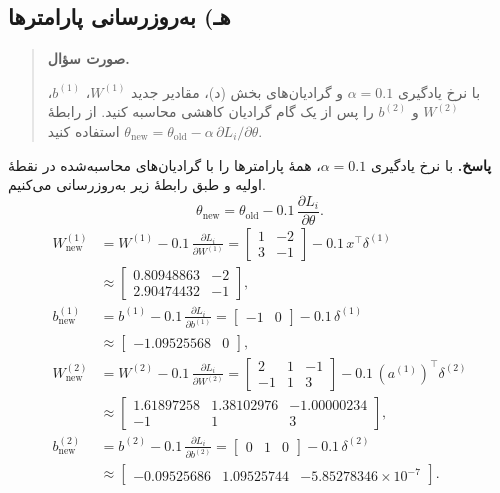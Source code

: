 \documentclass{article}
\numberwithin{equation}{section}
\numberwithin{table}{section}
\newenvironment{questionprompt}{%
    \begin{quote}\noindent\textbf{صورت سؤال.}\enspace\ignorespaces
}{%
    \end{quote}\noindent\textbf{پاسخ.}\enspace\ignorespacesafterend
}
\begin{document}
\subsection*{هـ) به‌روزرسانی پارامترها}
\begin{questionprompt}
    با نرخ یادگیری \(\alpha=0.1\) و گرادیان‌های بخش (د)، مقادیر جدید \(W^{(1)}\)، \(b^{(1)}\)، \(W^{(2)}\) و \(b^{(2)}\) را پس از یک گام گرادیان کاهشی محاسبه کنید. از رابطهٔ \(\theta_{\mathrm{new}}=\theta_{\mathrm{old}}-\alpha\,\partial L_i/\partial\theta\) استفاده کنید.
\end{questionprompt}
با نرخ یادگیری \(\alpha=0.1\)، همهٔ پارامترها را با گرادیان‌های محاسبه‌شده در نقطهٔ اولیه و طبق رابطهٔ زیر به‌روزرسانی می‌کنیم.
\[
    \theta_{\mathrm{new}}=\theta_{\mathrm{old}}-0.1\,\frac{\partial L_i}{\partial\theta}.
\]
\begin{align*}
    W_{\mathrm{new}}^{(1)}
    &=W^{(1)}-0.1\,\frac{\partial L_i}{\partial W^{(1)}}
      =\begin{bmatrix}1&-2\\3&-1\end{bmatrix}-0.1\,x^\top\delta^{(1)}\\
    &\approx\begin{bmatrix}0.80948863&-2\\2.90474432&-1\end{bmatrix},\\
    b_{\mathrm{new}}^{(1)}
    &=b^{(1)}-0.1\,\frac{\partial L_i}{\partial b^{(1)}}
      =\begin{bmatrix}-1&0\end{bmatrix}-0.1\,\delta^{(1)}\\
    &\approx\begin{bmatrix}-1.09525568&0\end{bmatrix},\\
    W_{\mathrm{new}}^{(2)}
    &=W^{(2)}-0.1\,\frac{\partial L_i}{\partial W^{(2)}}
      =\begin{bmatrix}2&1&-1\\-1&1&3\end{bmatrix}-0.1\,(a^{(1)})^\top\delta^{(2)}\\
    &\approx\begin{bmatrix}1.61897258&1.38102976&-1.00000234\\-1&1&3\end{bmatrix},\\
    b_{\mathrm{new}}^{(2)}
    &=b^{(2)}-0.1\,\frac{\partial L_i}{\partial b^{(2)}}
      =\begin{bmatrix}0&1&0\end{bmatrix}-0.1\,\delta^{(2)}\\
    &\approx\begin{bmatrix}-0.09525686&1.09525744&-5.85278346\times10^{-7}\end{bmatrix}.
\end{align*}
\end{document}
